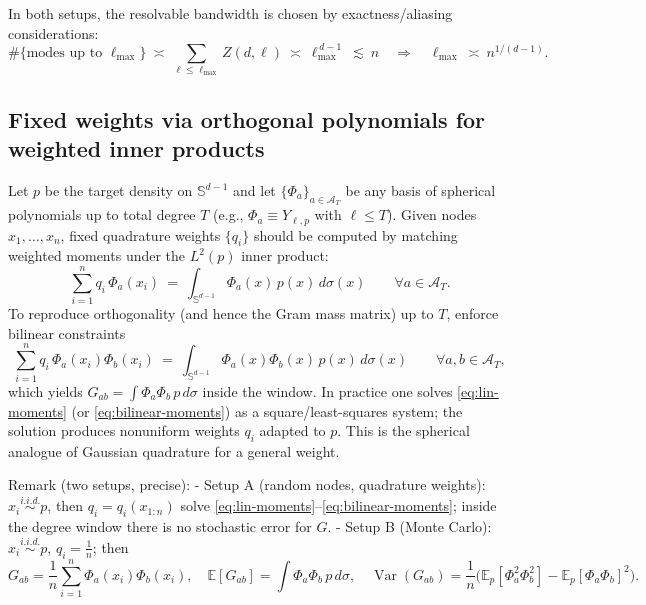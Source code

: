 \documentclass{article}
\newcommand{\E}{\mathbb{E}}
\newcommand{\Sphere}{\mathbb{S}^{d-1}}
\begin{document}
In both setups, the resolvable bandwidth is chosen by exactness/aliasing considerations:
\[
\#\{\text{modes up to } \ell_{\max}\}\ \asymp\ \sum_{\ell\le \ell_{\max}} Z(d,\ell)\ \asymp\ \ell_{\max}^{\,d-1}\ \lesssim\ n
\quad\Rightarrow\quad \ell_{\max}\ \asymp\ n^{1/(d-1)}.
\]

\subsection{Fixed weights via orthogonal polynomials for weighted inner products}
Let $p$ be the target density on $\Sphere$ and let $\{\Phi_a\}_{a\in\mathcal{A}_T}$ be any basis of spherical polynomials up to total degree $T$ (e.g., $\Phi_a\equiv Y_{\ell,p}$ with $\ell\le T$). Given nodes $x_1,\dots,x_n$, fixed quadrature weights $\{q_i\}$ should be computed by matching weighted moments under the $L^2(p)$ inner product:
\begin{equation}
\sum_{i=1}^n q_i\,\Phi_a(x_i) \ =\ \int_{\Sphere}\Phi_a(x)\,p(x)\,d\sigma(x)\qquad \forall a\in\mathcal{A}_T. \label{eq:lin-moments}
\end{equation}
To reproduce orthogonality (and hence the Gram mass matrix) up to $T$, enforce bilinear constraints
\begin{equation}
\sum_{i=1}^n q_i\,\Phi_a(x_i)\Phi_b(x_i)\ =\ \int_{\Sphere}\Phi_a(x)\Phi_b(x)\,p(x)\,d\sigma(x) \qquad \forall a,b\in\mathcal{A}_T, \label{eq:bilinear-moments}
\end{equation}
which yields $G_{ab}=\int \Phi_a\Phi_b\,p\,d\sigma$ inside the window. In practice one solves \eqref{eq:lin-moments} (or \eqref{eq:bilinear-moments}) as a square/least-squares system; the solution produces nonuniform weights $q_i$ adapted to $p$. This is the spherical analogue of Gaussian quadrature for a general weight.

Remark (two setups, precise):
- Setup A (random nodes, quadrature weights): $x_i\stackrel{i.i.d.}{\sim}p$, then $q_i=q_i(x_{1:n})$ solve \eqref{eq:lin-moments}–\eqref{eq:bilinear-moments}; inside the degree window there is no stochastic error for $G$.
- Setup B (Monte Carlo): $x_i\stackrel{i.i.d.}{\sim}p$, $q_i=\frac{1}{n}$; then
\[
G_{ab}=\frac{1}{n}\sum_{i=1}^n \Phi_a(x_i)\Phi_b(x_i),\quad \E[G_{ab}]=\int \Phi_a\Phi_b\,p\,d\sigma,\quad \operatorname{Var}(G_{ab})=\frac{1}{n}\Big(\E_p[\Phi_a^2\Phi_b^2]-\E_p[\Phi_a\Phi_b]^2\Big).
\]
\end{document}
